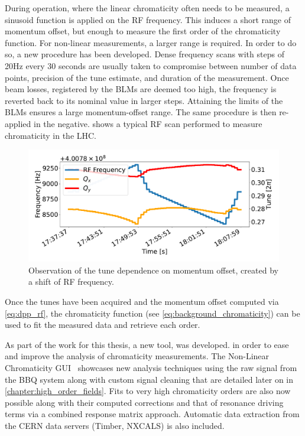 During operation, where the linear chromaticity often needs to be measured, a sinusoid function is
applied on the RF frequency. This induces a short range of momentum offset, but enough to measure
the first order of the chromaticity function.
For non-linear measurements, a larger range is required. In order to do so, a new procedure has been
developed. Dense frequency scans with steps of 20Hz every 30 seconds are usually taken to compromise
between number of data points, precision of the tune estimate, and duration of the measurement. Once
beam losses, registered by the BLMs are deemed too high, the frequency is reverted back to its
nominal value in larger steps. Attaining the limits of the BLMs ensures a large momentum-offset
range. The same procedure is then re-applied in the negative.  shows
a typical RF scan performed to measure chromaticity in the LHC.

\begin{figure}[H]
    \centering
    \includegraphics[width=1\textwidth]{images/rf_scan.pdf}
    \caption{Observation of the tune dependence on momentum offset, created by a shift of RF
             frequency.}
    \label{fig:measurements:rf_scan}
\end{figure}



Once the tunes have been acquired and the momentum offset computed via \cref{eq:dpp_rf}, the
chromaticity function (see \cref{eq:background_chromaticity}) can be used to fit the
measured data and retrieve each order.

As part of the work for this thesis, a new tool, was developed. in order to ease and improve the
analysis of chromaticity measurements. 
The Non-Linear Chromaticity GUI~\cite{m_le_garrec_non-linear_2022} showcases new analysis techniques
using the raw signal from the BBQ system along with custom signal cleaning that are detailed later
on in \cref{chapter:high_order_fields}. Fits to very high chromaticity orders are also now possible
along with their computed corrections and that of resonance driving terms via a combined response
matrix approach. Automatic data extraction from the CERN data servers (Timber, NXCALS) is also
included.
